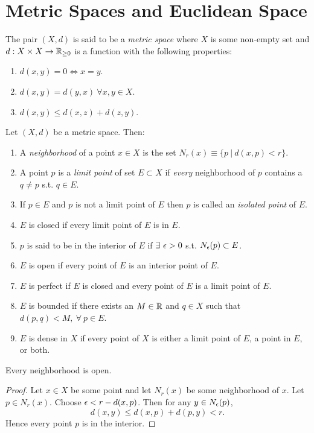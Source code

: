 \section{Metric Spaces and Euclidean Space}
\begin{definition}
  The pair $(X,d)$ is said to be a \textit{metric space} where $X$ is some non-empty set and $d:X\times X\to \mathbb{R}_{\geq 0}$ is a function with the following properties:
\begin{enumerate}
  \item $d(x,y) = 0 \iff x = y$.
  \item $d(x,y) = d(y,x)\ \forall x,y\in X$.
  \item $d(x,y) \leq d(x,z) + d(z,y)$.
\end{enumerate}
\end{definition}
\begin{definition}
  Let $(X,d)$ be a metric space. Then:
  \begin{enumerate}
    \item A \textit{neighborhood} of a point $x\in X$ is the set $N_r(x) \equiv \{p\ |\ d(x,p) <r\}$.
    \item A point $p$ is a \textit{limit point} of set $E\subset X$ if \textit{every} neighborhood of $p$ contains a $q\neq p$ s.t. $q\in E$.
    \item If $p\in E$ and $p$ is not a limit point of $E$ then $p$ is called an \textit{isolated point} of $E$.
    \item $E$ is closed if every limit point of $E$ is in $E$.
    \item $p$ is said to be in the interior of $E$ if $\exists\ \epsilon>0$ s.t. $N_\epsilon(p)\subset E$.
    \item $E$ is open if every point of $E$ is an interior point of $E$.
    \item $E$ is perfect if $E$ is closed and every point of $E$ is a limit point of $E$.
    \item $E$ is bounded if there exists an $M\in \mathbb{R}$ and $q\in X$ such that $d(p,q) < M,\ \forall\ p\in E$.
    \item $E$ is dense in $X$ if every point of $X$ is either a limit point of $E$, a point in $E$, or both.
  \end{enumerate}
\end{definition}
\begin{proposition}
  Every neighborhood is open.
\end{proposition}
\begin{proof}
  Let $x\in X$ be some point and let $N_r(x)$ be some neighborhood of $x$. Let $p\in N_r(x)$. Choose $\epsilon < r- d(x,p)$. Then for any $y\in N_\epsilon(p)$, 
  \[d(x,y) \leq d(x,p) + d(p,y) < r.\]
  Hence every point $p$ is in the interior.
\end{proof}
